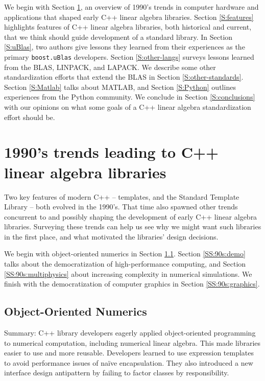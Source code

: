 We begin with Section \ref{S:90s}, an overview of 1990's trends in
computer hardware and applications that shaped early C++ linear
algebra libraries.  Section \ref{S:features} highlights features of
C++ linear algebra libraries, both historical and current, that we
think should guide development of a standard library.  In Section
\ref{S:uBlas}, two authors give lessons they learned from their
experiences as the primary \texttt{boost.uBlas} developers.  Section
\ref{S:other-langs} surveys lessons learned from the BLAS, LINPACK,
and LAPACK.  We describe some other standardization efforts that
extend the BLAS in Section \ref{S:other-standards}.  Section
\ref{S:Matlab} talks about MATLAB, and Section \ref{S:Python} outlines
experiences from the Python community.  We conclude in Section
\ref{S:conclusions} with our opinions on what some goals of a C++
linear algebra standardization effort should be.

\section{1990's trends leading to C++ linear algebra libraries}
\label{S:90s}

Two key features of modern C++ -- templates, and the Standard Template
Library -- both evolved in the 1990's.  That time also spawned other
trends concurrent to and possibly shaping the development of early C++
linear algebra libraries.  Surveying these trends can help us see why
we might want such libraries in the first place, and what motivated
the libraries' design decisions.

We begin with object-oriented numerics in Section \ref{SS:90s:OON}.
Section \ref{SS:90s:demo} talks about the democratization of
high-performance computing, and Section \ref{SS:90s:multiphysics}
about increasing complexity in numerical simulations.  We finish with
the democratization of computer graphics in Section
\ref{SS:90s:graphics}.

\subsection{Object-Oriented Numerics}
\label{SS:90s:OON}

Summary: C++ library developers eagerly applied object-oriented
programming to numerical computation, including numerical linear
algebra.  This made libraries easier to use and more reusable.
Developers learned to use expression templates to avoid performance
issues of na\"ive encapsulation.  They also introduced a new interface
design antipattern by failing to factor classes by responsibility.

